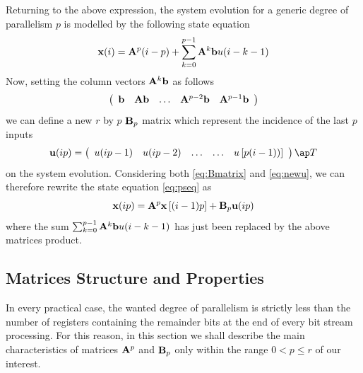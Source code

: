 Returning to the above expression, the system evolution for a generic degree of parallelism $p$ is modelled by the following state equation
\begin{equation}\label{eq:pseq}
\mathbf{x}(i) = \mathbf{A}^p(i-p) + \sum_{k=0}^{p-1}{\mathbf{A}^k \mathbf{b} u(i-k-1)}
\end{equation}
Now, setting the column vectors $\mathbf{A}^k \mathbf{b}$ as follows
\begin{equation}\label{eq:Bmatrix}
\left(
\begin{array}{ccccc}
  \mathbf{b} & \mathbf{Ab} & \ldots & \mathbf{A}^{p-2} \mathbf{b} &  \mathbf{A}^{p-1} \mathbf{b}
\end{array}
\right)
\end{equation}
we can define a new $r$ by $p$ $\mathbf{B}_p$ matrix which represent the incidence of the last $p$ inputs
\begin{equation}\label{eq:newu}
\vet u(ip) =
\left(
\begin{array}{ccccc}
  u(ip-1)   & u(ip-2) & \ldots  & \ldots & u \left[ p(i-1))\right] \\
\end{array}
\right)\ap T
\end{equation}
on the system evolution. Considering both \eqref{eq:Bmatrix} and \eqref{eq:newu}, we can therefore rewrite the state equation \eqref{eq:pseq} as
\begin{equation} \label{eq:SEmatr}
\mathbf{x} (ip) = \mathbf{A}^p \mathbf{x} \left[ (i-1)p \right] + \mathbf{B}_p \mathbf{u}(ip)
\end{equation}
where the sum $\sum_{k=0}^{p-1}{\mathbf{A}^k \mathbf{b} u(i-k-1)}$ has just been replaced by the above matrices product.

\subsection{Matrices Structure and Properties} \label{sec:Regularity}

In every practical case, the wanted degree of parallelism is strictly less than the number of registers containing the remainder bits at the end of every bit stream processing. For this reason, in this section we shall describe the main characteristics of matrices $\mathbf{A}^p$ and $\mathbf{B}_p$ only within the range $0 < p \le r$ of our interest.

